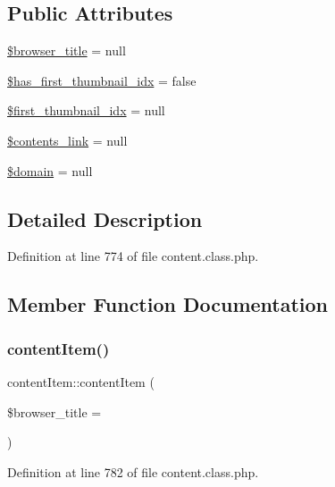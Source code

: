 \subsection*{Public Attributes}
\begin{DoxyCompactItemize}
\item 
\hyperlink{classcontentItem_abaf3b2f2d6878f8568161f4fce4e80bf}{\$browser\+\_\+title} = null
\item 
\hyperlink{classcontentItem_a78da7867160d34bf7e422524f6a78c37}{\$has\+\_\+first\+\_\+thumbnail\+\_\+idx} = false
\item 
\hyperlink{classcontentItem_a3ed95afadefbe20bd085e1d88220f4b1}{\$first\+\_\+thumbnail\+\_\+idx} = null
\item 
\hyperlink{classcontentItem_a6bf076b1d98025ee3f1d847fcf1fd29f}{\$contents\+\_\+link} = null
\item 
\hyperlink{classcontentItem_a428d40bc2148eae5661822963ba819b4}{\$domain} = null
\end{DoxyCompactItemize}


\subsection{Detailed Description}


Definition at line 774 of file content.\+class.\+php.



\subsection{Member Function Documentation}
\mbox{\label{classcontentItem_a6d43634cb803585fa2a0feb13f63fad4}} 
\subsubsection{\texorpdfstring{content\+Item()}{contentItem()}}
{\footnotesize\ttfamily content\+Item\+::content\+Item (\begin{DoxyParamCaption}\item[{}]{\$browser\+\_\+title = {\ttfamily \textquotesingle{}\textquotesingle{}} }\end{DoxyParamCaption})}



Definition at line 782 of file content.\+class.\+php.

